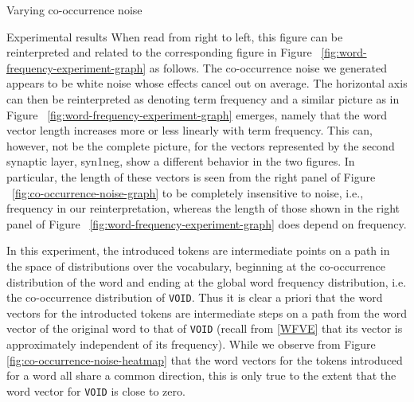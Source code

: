 \documentclass{article} %
\newcommand{\word}[1]{\texttt{#1}}
\begin{document}
\begin{section}{Varying co-occurrence noise}
\begin{subsection}{Experimental results}
When read from right to left, this figure can be reinterpreted and
related to the corresponding figure in
Figure ~\ref{fig:word-frequency-experiment-graph} as follows.  The
co-occurrence noise we generated appears to be white noise whose effects
cancel out on average.  The horizontal axis can then be reinterpreted as
denoting term frequency and a similar picture as in
Figure ~\ref{fig:word-frequency-experiment-graph} emerges, namely that the
word vector length increases more or less linearly with term frequency.
This can, however, not be the complete picture, for the vectors
represented by the second synaptic layer, syn1neg, show a different
behavior in the two figures.  In particular, the length of these vectors
is seen from the right panel of Figure ~\ref{fig:co-occurrence-noise-graph}
to be completely insensitive to noise, i.e., frequency in our
reinterpretation, whereas the length of those shown in the right panel
of Figure ~\ref{fig:word-frequency-experiment-graph} does depend on
frequency.

In this experiment, the introduced tokens are intermediate points on a path in the space of distributions over the vocabulary, beginning at the co-occurrence distribution of the word and ending at the global word frequency distribution, i.e. the co-occurrence distribution of \word{VOID}.
Thus it is clear a priori that the word vectors for the introducted tokens are intermediate steps on a path from the word vector of the original word to that of \word{VOID} (recall from \ref{WFVE} that its vector is approximately independent of its frequency).
While we observe from Figure \ref{fig:co-occurrence-noise-heatmap} that the word vectors for the tokens introduced for a word all share a common direction, this is only true to the extent that the word vector for \word{VOID} is close to zero.


\end{subsection}
\end{section}
\end{document}
